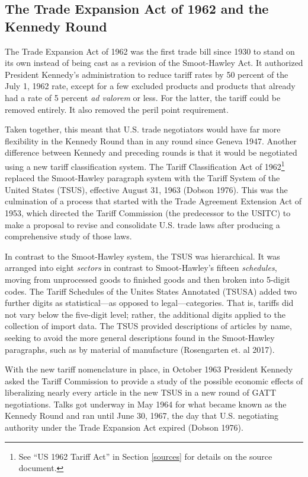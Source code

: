 \documentclass[
  12pt,
]{article}
\begin{document}
\hypertarget{TSUS}{%
\subsection{The Trade Expansion Act of 1962 and the Kennedy Round}\label{TSUS}}

The Trade Expansion Act of 1962 was the first trade bill since 1930 to stand on its own instead of being cast as a revision of the Smoot-Hawley Act. It authorized President Kennedy's administration to reduce tariff rates by 50 percent of the July 1, 1962 rate, except for a few excluded products and products that already had a rate of 5 percent \emph{ad valorem} or less. For the latter, the tariff could be removed entirely. It also removed the peril point requirement.

Taken together, this meant that U.S. trade negotiators would have far more flexibility in the Kennedy Round than in any round since Geneva 1947. Another difference between Kennedy and preceding rounds is that it would be negotiated using a new tariff classification system. The Tariff Classification Act of 1962\footnote{See ``US 1962 Tariff Act'' in Section \ref{sources} for details on the source document.} replaced the Smoot-Hawley paragraph system with the Tariff System of the United States (TSUS), effective August 31, 1963 (Dobson 1976). This was the culmination of a process that started with the Trade Agreement Extension Act of 1953, which directed the Tariff Commission (the predecessor to the USITC) to make a proposal to revise and consolidate U.S. trade laws after producing a comprehensive study of those laws.

In contrast to the Smoot-Hawley system, the TSUS was hierarchical. It was arranged into eight \emph{sectors} in contrast to Smoot-Hawley's fifteen \emph{schedules}, moving from unprocessed goods to finished goods and then broken into 5-digit codes. The Tariff Schedules of the Unites States Annotated (TSUSA) added two further digits as statistical---as opposed to legal---categories. That is, tariffs did not vary below the five-digit level; rather, the additional digits applied to the collection of import data. The TSUS provided descriptions of articles by name, seeking to avoid the more general descriptions found in the Smoot-Hawley paragraphs, such as by material of manufacture (Rosengarten et. al 2017).

With the new tariff nomenclature in place, in October 1963 President Kennedy asked the Tariff Commission to provide a study of the possible economic effects of liberalizing nearly every article in the new TSUS in a new round of GATT negotiations. Talks got underway in May 1964 for what became known as the Kennedy Round and ran until June 30, 1967, the day that U.S. negotiating authority under the Trade Expansion Act expired (Dobson 1976).
\end{document}
